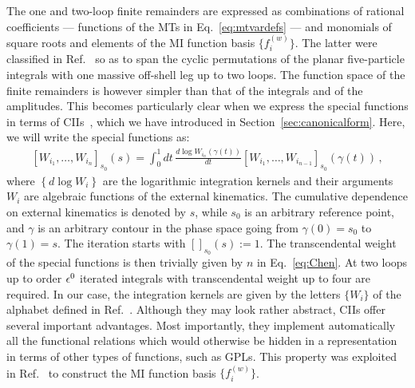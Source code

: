 \documentclass[main.tex]{subfiles}
\begin{document}
\label{Hbbsec:Hbasis}
The one and two-loop finite remainders are expressed as combinations of rational coefficients --- functions of the MTs in Eq.~\ref{eq:mtvardefs} --- and monomials of square roots and elements of the MI function basis $\{f^{(w)}_i\}$. The latter were classified in Ref.~\cite{Badger:2021nhg} so as to span the cyclic permutations of the planar five-particle integrals with one massive off-shell leg up to two loops. The function space of the finite remainders is however simpler than that of the integrals and of the amplitudes. This becomes particularly clear when we express the special functions in terms of CIIs~\cite{Chen:1977oja}, which we have introduced in Section~\ref{sec:canonicalform}. Here, we will write the special functions as:
\begin{align} \label{eq:Chen}
\left[W_{i_1}, \ldots, W_{i_n}  \right]_{s_0} (s) = \int_0^1 dt \, \frac{d \log W_{i_n}\left(\gamma(t)\right)}{dt} \left[W_{i_1}, \ldots, W_{i_{n-1}}  \right]_{s_0} \left(\gamma(t)\right) \,,
\end{align}
where $\left\{ d\log W_i \right\}$ are the logarithmic integration kernels and their arguments $W_i$ are algebraic functions of the external kinematics. The cumulative dependence on external kinematics is denoted by $s$, while $s_0$ is an arbitrary reference point, and $\gamma$ is an arbitrary contour in the phase space going from $\gamma(0)=s_0$ to $\gamma(1)=s$. The iteration starts with $[]_{s_0}(s) := 1$. The transcendental weight of the special functions is then trivially given by $n$ in Eq.~\ref{eq:Chen}. At two loops up to order $\epsilon^0$ iterated integrals with transcendental weight up to four are required. In our case, the integration kernels are given by the letters $\{W_i\}$ of the alphabet defined in Ref.~\cite{Abreu:2020jxa}. 
Although they may look rather abstract, CIIs offer several important advantages. Most importantly, they implement automatically all the functional relations which would otherwise be hidden in a representation in terms of other types of functions, such as GPLs. This property was exploited in Ref.~\cite{Badger:2021nhg} to construct the MI function basis $\{f^{(w)}_i\}$. 
\end{document}
